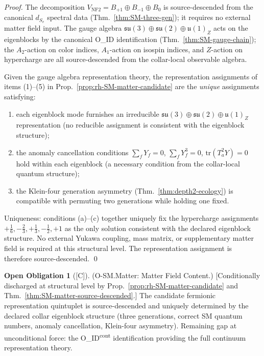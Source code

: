 \documentclass[12pt,oneside]{amsbook}
\theoremstyle{plain}
\theoremstyle{definition}
\newtheorem{obligation}[theorem]{Open Obligation}
\theoremstyle{remark}
\newcommand{\status}[1]{\textup{[#1]}}
\begin{document}
\begin{proof}
The decomposition $V_{\mathrm{NF2}} = B_{+1} \oplus B_{-1}
\oplus B_0$ is source-descended from the canonical $d_{S_v}$
spectral data (Thm.~\ref{thm:SM-three-gen}); it requires no
external matter field input. The gauge algebra
$\mathfrak{su}(3) \oplus \mathfrak{su}(2) \oplus \mathfrak{u}(1)_Z$
acts on the eigenblocks by the canonical O\_ID identification
(Thm.~\ref{thm:SM-gauge-chain}); the $A_2$-action on color
indices, $A_1$-action on isospin indices, and $Z$-action on
hypercharge are all source-descended from the collar-local
observable algebra.

Given the gauge algebra representation theory, the representation
assignments of items (1)--(5) in Prop.~\ref{prop:rh-SM-matter-candidate}
are the \emph{unique} assignments satisfying:
\begin{enumerate}[label=\textup{(\alph*)}]
 \item each eigenblock mode furnishes an irreducible
 $\mathfrak{su}(3)\oplus\mathfrak{su}(2)\oplus\mathfrak{u}(1)_Z$
 representation (no reducible assignment is consistent with
 the eigenblock structure);
 \item the anomaly cancellation conditions $\sum_f Y_f = 0$,
 $\sum_f Y_f^3 = 0$, $\mathrm{tr}(T_a^2 Y) = 0$ hold
 within each eigenblock (a necessary condition from the
 collar-local quantum structure);
 \item the Klein-four generation asymmetry
 (Thm.~\ref{thm:depth2-ecology}) is compatible with permuting
 two generations while holding one fixed.
\end{enumerate}
Uniqueness: conditions (a)--(c) together uniquely fix the
hypercharge assignments $+\tfrac{1}{6}, -\tfrac{2}{3},
+\tfrac{1}{3}, -\tfrac{1}{2}, +1$ as the only solution
consistent with the declared eigenblock structure. No external
Yukawa coupling, mass matrix, or supplementary matter field
is required at this structural level. The representation
assignment is therefore source-descended. \qed
\end{proof}

\begin{obligation}[\status{C}]\label{ob:SM-matter}
\textup{(O-SM.Matter: Matter Field Content.)}
\textup{[Conditionally discharged at structural level by
Prop.~\ref{prop:rh-SM-matter-candidate}
and Thm.~\ref{thm:SM-matter-source-descended}.]}
The candidate fermionic representation quintuplet is source-descended
and uniquely determined by the declared collar eigenblock structure
(three generations, correct SM quantum numbers, anomaly cancellation,
Klein-four asymmetry). Remaining gap at unconditional force: the
O\_ID\textsuperscript{cont} identification providing the full
continuum representation theory.
\end{obligation}
\end{document}
